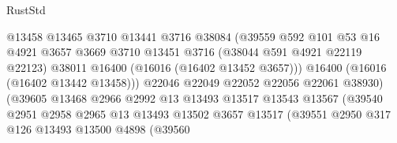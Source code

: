 \begin{lexlean}{RustStd}
\begin{coremodule}
                                        @13458
                                        @13465
                                        @3710
                                        @13441
                                        @3716
                                        @38084
                                        (@39559
                                          @592
                                          @101
                                          @53
                                          @16
                                          @4921
                                          @3657
                                          @3669
                                          @3710
                                          @13451
                                          @3716
                                          (@38044 @591 @4921 @22119 @22123)
                                          @38011
                                          @16400
                                          (@16016 (@16402 @13452 @3657)))
                                        @16400
                                        (@16016 (@16402 @13442 @13458)))
                                      @22046
                                      @22049
                                      @22052
                                      @22056
                                      @22061
                                      @38930)
                                    (@39605
                                      @13468
                                      @2966
                                      @2992
                                      @13
                                      @13493
                                      @13517
                                      @13543
                                      @13567
                                      (@39540
                                        @2951
                                        @2958
                                        @2965
                                        @13
                                        @13493
                                        @13502
                                        @3657
                                        @13517
                                        (@39551
                                          @2950
                                          @317
                                          @126
                                          @13493
                                          @13500
                                          @4898
                                          (@39560

\end{coremodule}
\end{lexlean}
